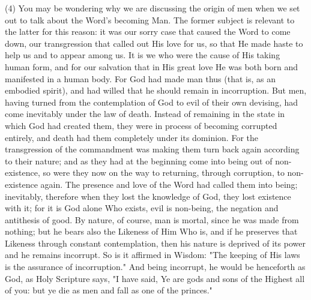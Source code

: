 \documentclass[9pt, twocolumn, oneside, a4paper]{memoir}
\begin{document}
\textsc{(4)} You may be wondering why we are discussing the       origin of men when we set out to talk about the Word's becoming Man. The former       subject is relevant to the latter for this reason: it was our sorry case that       caused the Word to come down, our transgression that called out His love for us,       so that He made haste to help us and to appear among us. It is we who were the       cause of His taking human form, and for our salvation that in His great love He       was both born and manifested in a human body. For God had made man thus (that       is, as an embodied spirit), and had willed that he should remain in       incorruption. But men, having turned from the contemplation of God to evil of       their own devising, had come inevitably under the law of death. Instead of       remaining in the state in which God had created them, they were in process of       becoming corrupted entirely, and death had them completely under its dominion.       For the       transgression of the commandment was making them turn back again       according to their nature; and as they had at the beginning come into being out       of non-existence, so were they now on the way to returning, through corruption,       to non-existence again. The presence and love of the Word had called them into       being; inevitably, therefore when they lost the knowledge of God, they lost       existence with it; for it is God alone Who exists, evil is non-being, the       negation and antithesis of good. By nature, of course, man is mortal, since he       was made from nothing; but he bears also the Likeness of Him Who is, and if he       preserves that Likeness through constant contemplation, then his nature is       deprived of its power and he remains incorrupt. So is it affirmed in Wisdom:       "The keeping of His laws is the assurance of       incorruption."       And being incorrupt, he would be henceforth as God, as Holy Scripture says,       "I have said, Ye are gods and sons of the Highest all       of you: but ye die as men and fall as one of the princes."
\end{document}
